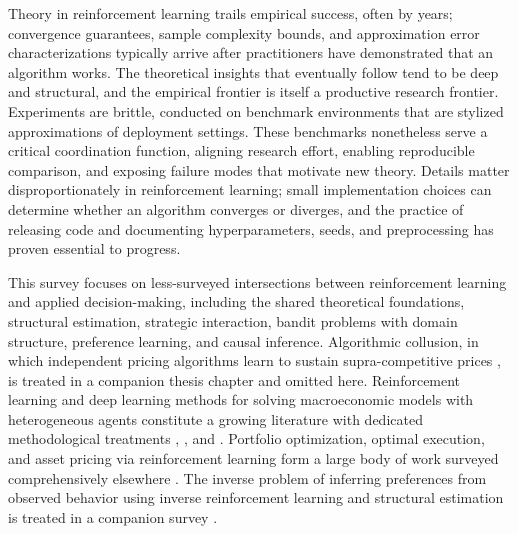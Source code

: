 Theory in reinforcement learning trails empirical success, often by years; convergence guarantees, sample complexity bounds, and approximation error characterizations typically arrive after practitioners have demonstrated that an algorithm works. The theoretical insights that eventually follow tend to be deep and structural, and the empirical frontier is itself a productive research frontier. Experiments are brittle, conducted on benchmark environments that are stylized approximations of deployment settings. These benchmarks nonetheless serve a critical coordination function, aligning research effort, enabling reproducible comparison, and exposing failure modes that motivate new theory. Details matter disproportionately in reinforcement learning; small implementation choices can determine whether an algorithm converges or diverges, and the practice of releasing code and documenting hyperparameters, seeds, and preprocessing has proven essential to progress.

This survey focuses on less-surveyed intersections between reinforcement learning and applied decision-making, including the shared theoretical foundations, structural estimation, strategic interaction, bandit problems with domain structure, preference learning, and causal inference. Algorithmic collusion, in which independent pricing algorithms learn to sustain supra-competitive prices \citep{Calvano2020}, is treated in a companion thesis chapter \citep{Rawat2026collusion} and omitted here. Reinforcement learning and deep learning methods for solving macroeconomic models with heterogeneous agents constitute a growing literature with dedicated methodological treatments \citep{AtashbarShi2022}, \citep{MaliarMaliarWinant2021}, and \citep{FernandezVillaverdeNunoPerla2024}. Portfolio optimization, optimal execution, and asset pricing via reinforcement learning form a large body of work surveyed comprehensively elsewhere \citep{HamblyXuYang2023}. The inverse problem of inferring preferences from observed behavior using inverse reinforcement learning and structural estimation is treated in a companion survey \citep{RustRawat2026}.

